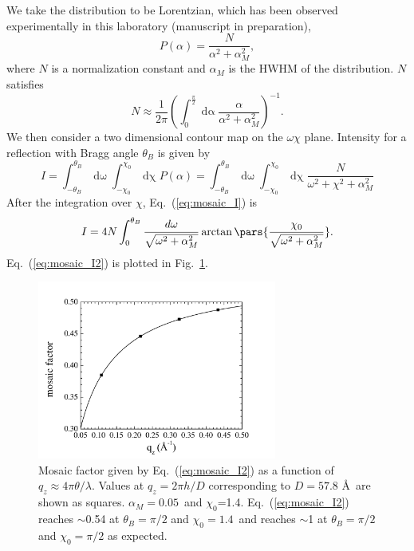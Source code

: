 We take the distribution to be Lorentzian, which has been observed 
experimentally in this laboratory (manuscript in preparation),
\begin{equation}
  P(\alpha) = \frac{N}{\alpha^2+\alpha_M^2},
\end{equation}
where $N$ is a normalization constant and $\alpha_M$ is the HWHM of the 
distribution. $N$ satisfies
\begin{equation}
  N \approx \frac{1}{2\pi}\left(\int_0^{\frac{\pi}{2}}\mathop{d\alpha}
  \frac{\alpha}{\alpha^2+\alpha_M^2}\right)^{-1}.
  \label{eq:mosaic_N}
\end{equation}
We then consider a two dimensional contour map on the $\omega\chi$ plane.
Intensity for a reflection with Bragg angle $\theta_B$ is
given by
\begin{equation}
  I = \int_{-\theta_B}^{\theta_B}\mathop{d\omega} 
  \int_{-\chi_0}^{\chi_0}\mathop{d\chi} P(\alpha)
  = \int_{-\theta_B}^{\theta_B}\mathop{d\omega}
  \int_{-\chi_0}^{\chi_0}\mathop{d\chi}
  \frac{N}{\omega^2+\chi^2+\alpha_M^2}
  \label{eq:mosaic_I}
\end{equation}
After the integration over $\chi$, Eq.~(\ref{eq:mosaic_I}) is
\begin{equation}
  I = 4N\int_0^{\theta_B}\frac{d\omega}{\sqrt{\omega^2+\alpha_M^2}}
  \arctan\pars{\frac{\chi_0}{\sqrt{\omega^2+\alpha_M^2}}}.
  \label{eq:mosaic_I2}
\end{equation}
Eq.~(\ref{eq:mosaic_I2}) is plotted in Fig.~\ref{fig:mosaic_correction}.

\begin{figure}
  \centering
  \includegraphics[width=0.7\textwidth]{figures/ripple/analysis/mosaic_correction}
  \caption[Mosaic factor given by Eq.~(\ref{eq:mosaic_I2}) as a function of 
  $q_z\approx 4\pi\theta/\lambda$]{Mosaic factor given by 
  Eq.~(\ref{eq:mosaic_I2}) as a function of 
  $q_z\approx 4\pi\theta/\lambda$. Values at $q_z=2\pi h/D$ corresponding 
  to $D=57.8$ \AA\ are shown as squares. $\alpha_M=0.05$\textdegree\ and 
  $\chi_0$=1.4\textdegree. Eq.~(\ref{eq:mosaic_I2}) reaches $\sim$0.54 at 
  $\theta_B=\pi/2$ and $\chi_0=1.4$\textdegree\ and reaches $\sim$1 at
  $\theta_B=\pi/2$ and $\chi_0=\pi/2$ as expected.}
  \label{fig:mosaic_correction}
\end{figure}

